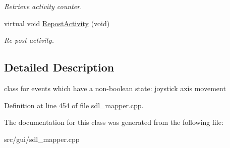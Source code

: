 \begin{DoxyCompactItemize}
\begin{DoxyCompactList}\small\item\em Retrieve activity counter. \end{DoxyCompactList}\item 
\hypertarget{classCContinuousEvent_a55ff5be014e082075eaeec0af43a51aa}{virtual void \hyperlink{classCContinuousEvent_a55ff5be014e082075eaeec0af43a51aa}{Repost\-Activity} (void)}\label{classCContinuousEvent_a55ff5be014e082075eaeec0af43a51aa}

\begin{DoxyCompactList}\small\item\em Re-\/post activity. \end{DoxyCompactList}\end{DoxyCompactItemize}


\subsection{Detailed Description}
class for events which have a non-\/boolean state\-: joystick axis movement 

Definition at line 454 of file sdl\-\_\-mapper.\-cpp.



The documentation for this class was generated from the following file\-:\begin{DoxyCompactItemize}
\item 
src/gui/sdl\-\_\-mapper.\-cpp\end{DoxyCompactItemize}
